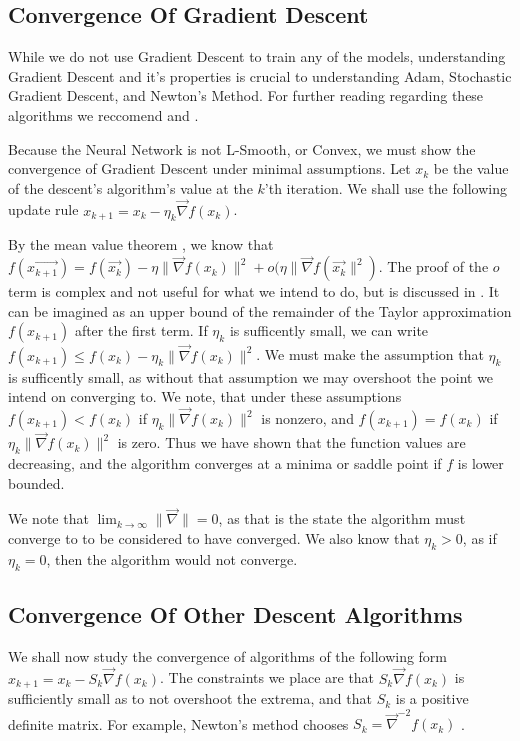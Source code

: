 \documentclass[10pt]{article}
\begin{document}
\subsection{Convergence Of Gradient Descent}
While we do not use Gradient Descent to train any of the models, understanding Gradient Descent and it's properties is crucial to understanding Adam, Stochastic Gradient Descent, and Newton's Method. For further reading regarding these algorithms we reccomend \cite{recht-wright}  and \cite{wikipediacontributors-2019-newtons}.

Because the Neural Network is not L-Smooth\cite{lipschitz}, or Convex, we must show the convergence of Gradient Descent under minimal assumptions. Let $x_k$ be the value of the descent's algorithm's value at the $k$'th iteration. We shall use the following update rule $x_{k+1} = x_k - \eta_k\vec{\nabla}f(x_k)$.


By the mean value theorem \cite{wikipediacontributors-2019-mean}, we know that $f(\vec{x_{k+1}}) = f(\vec{x_k}) - \eta \|\vec{\nabla}f(x_k)\|^2 + o(\eta\|\vec{\nabla}f(\vec{x_k}\|^2)$. The proof of the $o$ term is complex and not useful for what we intend to do, but is discussed in . It can be imagined as an upper bound of the remainder of the Taylor approximation $f(x_{k+1})$ after the first term. If $\eta_k$ is sufficently small, we can write $f(x_{k+1}) \leq f(x_k) - \eta_k \|\vec{\nabla}f(x_k)\|^2$. We must make the assumption that $\eta_k$ is sufficently small, as without that assumption we may overshoot the point we intend on converging to. We note, that under these assumptions $f(x_{k+1}) < f(x_k)$ if $\eta_k \|\vec{\nabla}f(x_k)\|^2$ is nonzero, and $f(x_{k+1}) = f(x_k)$ if $\eta_k \|\vec{\nabla}f(x_k)\|^2$ is zero. Thus we have shown that the function values are decreasing, and the algorithm converges at a minima or saddle point if $f$ is lower bounded.

We note that $\lim_{k \to \infty} \|\vec{\nabla}\| = 0$, as that is the state the algorithm must converge to to be considered to have converged.
We also know that $\eta_k > 0$, as if $\eta_k = 0$, then the algorithm would not converge.

\subsection{Convergence Of Other Descent Algorithms}

We shall now study the convergence of algorithms of the following form $x_{k+1} = x_k - S_k\vec{\nabla}f(x_k)$. The constraints we place are that $S_k\vec{\nabla}f(x_k)$ is sufficiently small as to not overshoot the extrema, and that $S_k$ is a positive definite matrix. For example, Newton's method chooses $S_k = \vec{\nabla}^{-2}f(x_k)$ \cite{recht-wright}.
\end{document}
